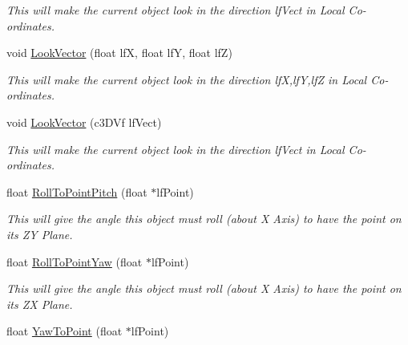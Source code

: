 \begin{DoxyCompactItemize}
\begin{DoxyCompactList}\small\item\em This will make the current object look in the direction lfVect in Local Co-\/ordinates. \end{DoxyCompactList}\item 
\hypertarget{classc_matrix4_a20184fd23338127b98d617086e12a934}{
void \hyperlink{classc_matrix4_a20184fd23338127b98d617086e12a934}{LookVector} (float lfX, float lfY, float lfZ)}
\label{classc_matrix4_a20184fd23338127b98d617086e12a934}

\begin{DoxyCompactList}\small\item\em This will make the current object look in the direction lfX,lfY,lfZ in Local Co-\/ordinates. \end{DoxyCompactList}\item 
\hypertarget{classc_matrix4_a9a08d629625f1c5f03b51b5739981e08}{
void \hyperlink{classc_matrix4_a9a08d629625f1c5f03b51b5739981e08}{LookVector} (c3DVf lfVect)}
\label{classc_matrix4_a9a08d629625f1c5f03b51b5739981e08}

\begin{DoxyCompactList}\small\item\em This will make the current object look in the direction lfVect in Local Co-\/ordinates. \end{DoxyCompactList}\item 
\hypertarget{classc_matrix4_a5cf9c759a7681810486a1f11f6bc3c64}{
float \hyperlink{classc_matrix4_a5cf9c759a7681810486a1f11f6bc3c64}{RollToPointPitch} (float $\ast$lfPoint)}
\label{classc_matrix4_a5cf9c759a7681810486a1f11f6bc3c64}

\begin{DoxyCompactList}\small\item\em This will give the angle this object must roll (about X Axis) to have the point on its ZY Plane. \end{DoxyCompactList}\item 
\hypertarget{classc_matrix4_af29fcc2d2ac6c266e8c8075944afb8fc}{
float \hyperlink{classc_matrix4_af29fcc2d2ac6c266e8c8075944afb8fc}{RollToPointYaw} (float $\ast$lfPoint)}
\label{classc_matrix4_af29fcc2d2ac6c266e8c8075944afb8fc}

\begin{DoxyCompactList}\small\item\em This will give the angle this object must roll (about X Axis) to have the point on its ZX Plane. \end{DoxyCompactList}\item 
\hypertarget{classc_matrix4_a2838155185f07e02acd1a8e07c532732}{
float \hyperlink{classc_matrix4_a2838155185f07e02acd1a8e07c532732}{YawToPoint} (float $\ast$lfPoint)}
\label{classc_matrix4_a2838155185f07e02acd1a8e07c532732}


\end{DoxyCompactItemize}

